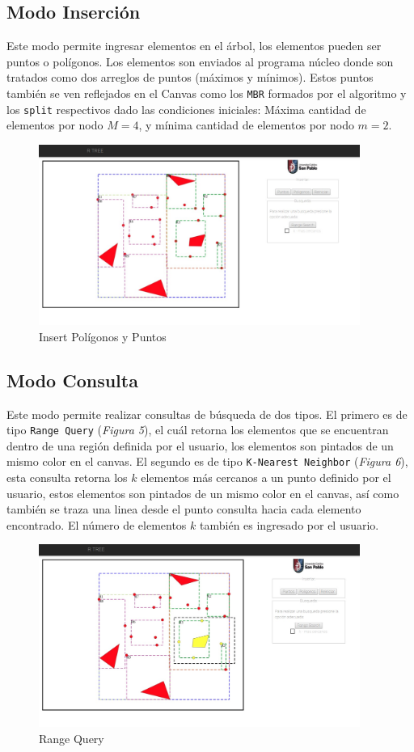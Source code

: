 \documentclass[a4paper]{article}
\begin{document}
\subsection{Modo Inserción}
Este modo permite ingresar elementos en el árbol, los elementos pueden ser puntos o polígonos. Los elementos son enviados al programa núcleo donde son tratados como dos arreglos de puntos (máximos y mínimos). Estos puntos también se ven reflejados en el Canvas como los \texttt{MBR} formados por el algoritmo y los \texttt{split} respectivos dado las condiciones iniciales: Máxima cantidad de elementos por nodo $M=4$, y mínima cantidad de elementos por nodo $m=2$.   
\begin{figure}[ht]
\centering
  \includegraphics[width=10.5cm]{images/insert.jpeg}
  \caption{Insert Polígonos y Puntos}
  \label{fig3}
\end{figure}
\subsection{Modo Consulta}
Este modo permite realizar consultas de búsqueda de dos tipos. El primero es de tipo \texttt{Range Query} (\textit{Figura 5}), el cuál retorna los elementos que se encuentran dentro de una región definida por el usuario, los elementos son pintados de un mismo color en el canvas. El segundo es de tipo \texttt{K-Nearest Neighbor} (\textit{Figura 6}), esta consulta retorna los $k$ elementos más cercanos a un punto definido por el usuario, estos elementos son pintados de un mismo color en el canvas, así como también se traza una linea desde el punto consulta hacia cada elemento encontrado. El número de elementos $k$ también es ingresado por el usuario. 
\begin{figure}[ht]
\centering
  \includegraphics[width=10.5cm]{images/search.jpeg}
  \caption{Range Query}
  \label{fig4}
\end{figure}
\end{document}

